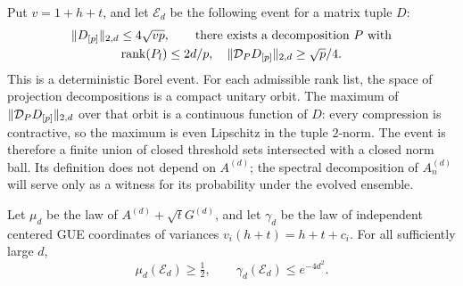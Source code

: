 Put $v=1+h+t$, and let $\mathcal E_d$ be the following event for a matrix
tuple $D$:
\begin{equation}\label{eq:event}
 \begin{gathered}
 \|D_{[p]}\|_{2,d}\leq4\sqrt{vp},\qquad
 \text{there exists a decomposition }P\text{ with}\\
 \operatorname{rank}(P_l)\leq2d/p,\quad
 \|\mathcal D_P D_{[p]}\|_{2,d}\geq\sqrt p/4.
 \end{gathered}
\end{equation}
This is a deterministic Borel event. For each admissible rank list, the
space of projection decompositions is a compact unitary orbit. The
maximum of $\|\mathcal D_P D_{[p]}\|_{2,d}$ over that orbit is a continuous
function of $D$: every compression is contractive, so the maximum is
even Lipschitz in the tuple $2$-norm. The event is therefore a finite
union of closed threshold sets intersected with a closed norm ball.
Its definition does not depend on $A^{(d)}$; the spectral decomposition
of $A_n^{(d)}$ will serve only as a witness for its probability under
the evolved ensemble.

\begin{lemma}\label{lem:eventprob}
Let $\mu_d$ be the law of $A^{(d)}+\sqrt t G^{(d)}$, and let $\gamma_d$
be the law of independent centered GUE coordinates of variances
$v_i(h+t)=h+t+c_i$. For all sufficiently large $d$,
\[
 \mu_d(\mathcal E_d)\geq\tfrac12,
 \qquad \gamma_d(\mathcal E_d)\leq e^{-4d^2}.
\]
\end{lemma}

